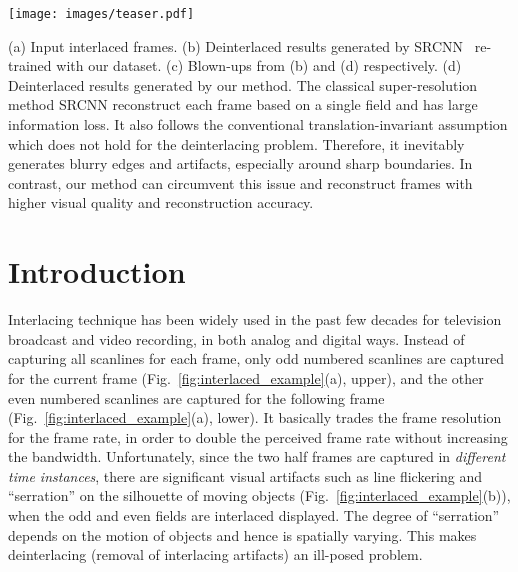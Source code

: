 \documentclass[acmtog]{acmart}
\begin{document}






\begin{teaserfigure}
  \texttt{[image: images/teaser.pdf]}
  \caption{(a) Input interlaced frames. (b) Deinterlaced results generated by SRCNN~\cite{dong2016image} re-trained with our dataset. (c) Blown-ups from (b) and (d) respectively. (d) Deinterlaced results generated by our method. The classical super-resolution method SRCNN reconstruct each frame based on a single field and has large information loss. It also follows the conventional translation-invariant assumption which does not hold for the deinterlacing problem. Therefore, it inevitably generates blurry edges and artifacts, especially around sharp boundaries. In contrast, our method can circumvent this issue and reconstruct frames with higher visual quality and reconstruction accuracy.}
  \label{fig:teaser}
\end{teaserfigure}

\maketitle

\section{Introduction}


Interlacing technique has been widely used in the past few decades for television
broadcast and video recording, in both analog and digital ways. Instead of capturing all
 scanlines for each frame, only  odd numbered scanlines are captured for
the current frame (Fig.~\ref{fig:interlaced_example}(a), upper), and the other
 even numbered scanlines are captured for the following frame
(Fig.~\ref{fig:interlaced_example}(a), lower). It basically trades the frame
resolution for the frame rate, in order to double the perceived frame rate
without increasing the bandwidth. Unfortunately, since the two half frames are
captured in {\em different time instances}, there are significant visual
artifacts such as line flickering and ``serration'' on the silhouette of moving
objects (Fig.~\ref{fig:interlaced_example}(b)), when the odd and even fields are
interlaced displayed. The degree of ``serration'' depends on the motion of objects
and hence is spatially varying. This makes deinterlacing (removal of interlacing artifacts) an ill-posed problem.
\end{document}
